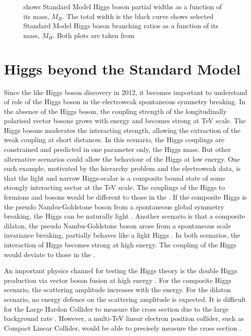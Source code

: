 \begin{figure}[tbph]
\begin{subfigure}[b]{0.45\textwidth}
        \caption{}
        \label{fig:theoryHiggsBranchingRatio}
    \end{subfigure}
\caption[SM Higgs boson decay width and branching ratios]%
{ shows Standard Model Higgs boson partial widths as a function of its mass, $M_H$. The total width is the black curve  shows selected Standard Model Higgs boson branching ratios as a function of its mass, $M_H$. Both plots are taken from \cite{Rainwater:2007cp} }
\label{fig:theoryHiggsPhenomenology}
\end{figure}


\section{Higgs beyond the Standard Model}
\label{sec:theoryHiggsBSM}

Since the \SM like Higgs boson discovery in 2012, it becomes important to understand of role of the Higgs boson in the electroweak spontaneous symmetry breaking. In the absence of the Higgs boson, the coupling strength of the longitudinally polarised vector bosons grows with energy and becomes strong at TeV scale. The \SM Higgs bosons moderates the interacting strength, allowing the extraction of the weak coupling at short distances. In this scenario, the \SM Higgs couplings are constrained and predicted in one parameter only, the Higgs mass. But other alternative scenarios could allow the behaviour of the \SM Higgs at low energy. One such example, motivated by the hierarchy problem and the electroweak data, is that the light and narrow Higgs-scalar is a composite bound state of some strongly interacting sector at the TeV scale. The couplings of the Higgs to fermions and bosons would be different to those in the \SM. If the composite Higgs is the pseudo Nambu-Goldstone boson from a spontaneous global symmetry breaking, the Higgs can be naturally light \cite{Kaplan:1983fs}. Another scenario is that a composite dilaton, the pseudo Nambu-Goldstone boson arose from a spontaneous scale invariance breaking, partially behaves like a light Higgs \cite{Goldberger:2008zz}. In both scenarios, the interaction of Higgs becomes strong at high energy. The coupling of the Higgs would deviate to those in the \SM.

An important physics channel for testing the Higgs theory is the double Higgs production via vector boson fusion at high energy \cite{Giudice:2007fh,Contino:2010mh,Contino:2013gna}. For the composite Higgs scenario, the scattering amplitude increases with the energy. For the dilaton scenario, no energy defence on the scattering amplitude is expected. It is difficult for the Large Hardon Collider to measure the cross section due to the large \SM background rate \cite{Contino:2010mh}. However, a multi-TeV linear electron position collider, such as Compact Linear Collider, would be able to precisely measure the cross section \cite{Barger:2003rs}.

